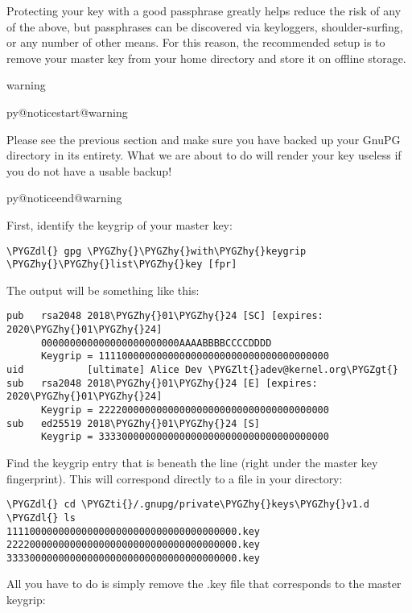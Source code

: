 \documentclass[a4paper,8pt,english]{sphinxmanual}
\makeatletter
\renewenvironment{notice}[2]{%
          \def\py@noticetype{#1}
          \begin{coloredbox}{#1}
          \bf\it
          \par\strong{#2}
          \csname py@noticestart@#1\endcsname
        }
	{
          \csname py@noticeend@\py@noticetype\endcsname
          \end{coloredbox}
        }
\def\PYGZlt{\char`\<}
\def\PYGZgt{\char`\>}
\def\PYGZdl{\char`\$}
\def\PYGZhy{\char`\-}
\def\PYGZti{\char`\~}
\makeatother
\begin{document}
Protecting your key with a good passphrase greatly helps reduce the risk
of any of the above, but passphrases can be discovered via keyloggers,
shoulder-surfing, or any number of other means. For this reason, the
recommended setup is to remove your master key from your home directory
and store it on offline storage.

\begin{notice}{warning}{Warning:}
Please see the previous section and make sure you have backed up
your GnuPG directory in its entirety. What we are about to do will
render your key useless if you do not have a usable backup!
\end{notice}

First, identify the keygrip of your master key:

\begin{Verbatim}[commandchars=\\\{\}]
\PYGZdl{} gpg \PYGZhy{}\PYGZhy{}with\PYGZhy{}keygrip \PYGZhy{}\PYGZhy{}list\PYGZhy{}key [fpr]
\end{Verbatim}

The output will be something like this:

\begin{Verbatim}[commandchars=\\\{\}]
pub   rsa2048 2018\PYGZhy{}01\PYGZhy{}24 [SC] [expires: 2020\PYGZhy{}01\PYGZhy{}24]
      000000000000000000000000AAAABBBBCCCCDDDD
      Keygrip = 1111000000000000000000000000000000000000
uid           [ultimate] Alice Dev \PYGZlt{}adev@kernel.org\PYGZgt{}
sub   rsa2048 2018\PYGZhy{}01\PYGZhy{}24 [E] [expires: 2020\PYGZhy{}01\PYGZhy{}24]
      Keygrip = 2222000000000000000000000000000000000000
sub   ed25519 2018\PYGZhy{}01\PYGZhy{}24 [S]
      Keygrip = 3333000000000000000000000000000000000000
\end{Verbatim}

Find the keygrip entry that is beneath the  line (right under the
master key fingerprint). This will correspond directly to a file in your
 directory:

\begin{Verbatim}[commandchars=\\\{\}]
\PYGZdl{} cd \PYGZti{}/.gnupg/private\PYGZhy{}keys\PYGZhy{}v1.d
\PYGZdl{} ls
1111000000000000000000000000000000000000.key
2222000000000000000000000000000000000000.key
3333000000000000000000000000000000000000.key
\end{Verbatim}

All you have to do is simply remove the .key file that corresponds to
the master keygrip:
\end{document}
